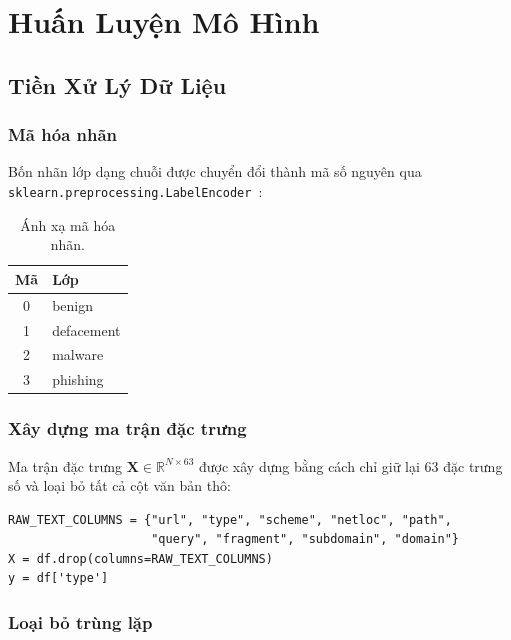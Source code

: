 \documentclass[a4paper,12pt]{article}
\begin{document}
\section{Huấn Luyện Mô Hình}
\label{sec:training}

\subsection{Tiền Xử Lý Dữ Liệu}

\subsubsection{Mã hóa nhãn}

Bốn nhãn lớp dạng chuỗi được chuyển đổi thành mã số nguyên qua \texttt{sklearn.preprocessing.LabelEncoder}~\cite{sklearn}:

\begin{table}[H]
\centering
\caption{Ánh xạ mã hóa nhãn.}
\begin{tabular}{cl}
\toprule
\textbf{Mã} & \textbf{Lớp} \\
\midrule
0 & benign \\
1 & defacement \\
2 & malware \\
3 & phishing \\
\bottomrule
\end{tabular}
\end{table}

\subsubsection{Xây dựng ma trận đặc trưng}

Ma trận đặc trưng $\mathbf{X} \in \mathbb{R}^{N \times 63}$ được xây dựng bằng cách chỉ giữ lại 63 đặc trưng số và loại bỏ tất cả cột văn bản thô:

\begin{lstlisting}[caption={Xây dựng ma trận đặc trưng}]
RAW_TEXT_COLUMNS = {"url", "type", "scheme", "netloc", "path",
                    "query", "fragment", "subdomain", "domain"}
X = df.drop(columns=RAW_TEXT_COLUMNS)
y = df['type']
\end{lstlisting}

\subsubsection{Loại bỏ trùng lặp}
\end{document}
